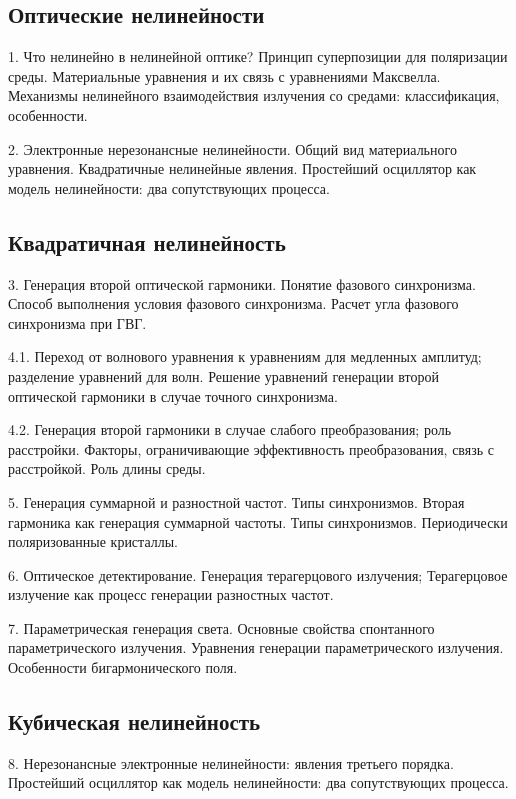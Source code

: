 \subsection*{Оптические нелинейности}

1. Что нелинейно в нелинейной оптике? Принцип суперпозиции для поляризации среды. Материальные уравнения и их связь с уравнениями Максвелла. Механизмы нелинейного взаимодействия излучения со средами: классификация, особенности.

2. Электронные нерезонансные нелинейности. Общий вид материального уравнения. Квадратичные нелинейные явления. Простейший осциллятор как модель нелинейности: два сопутствующих процесса.

\subsection*{Квадратичная нелинейность}


3. Генерация второй оптической гармоники. Понятие фазового синхронизма. Способ выполнения условия фазового синхронизма. Расчет угла фазового синхронизма при ГВГ.

4.1. Переход от волнового уравнения к уравнениям для медленных амплитуд; разделение уравнений для волн. Решение уравнений генерации второй оптической гармоники в случае точного синхронизма.

4.2. Генерация второй гармоники в случае слабого преобразования; роль расстройки. Факторы, ограничивающие эффективность преобразования, связь с расстройкой. Роль длины среды.

5. Генерация суммарной и разностной частот. Типы синхронизмов. Вторая гармоника как генерация суммарной частоты. Типы синхронизмов. Периодически поляризованные кристаллы.

6. Оптическое детектирование. Генерация терагерцового излучения; Терагерцовое излучение как процесс генерации разностных частот.

7. Параметрическая генерация света. Основные свойства спонтанного параметрического излучения. Уравнения генерации параметрического излучения. Особенности бигармонического поля.

\subsection*{Кубическая нелинейность}

8. Нерезонансные электронные нелинейности: явления третьего порядка. Простейший осциллятор как модель нелинейности: два сопутствующих процесса.

